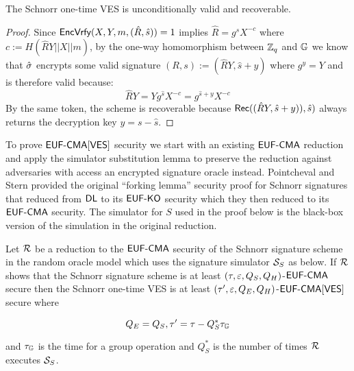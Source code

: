 \begin{lemma}
The Schnorr one-time VES is unconditionally valid and recoverable.
\end{lemma}

\begin{proof}
 Since $\textsf{EncVrfy}(X,Y,m,(\hat{R},\hat{s})) = 1$ implies $ \hat{R} = g^{\hat{s}}X^{-c}$ where $c := H(\hat{R}Y || X || m)$, by the one-way homomorphism between $\mathbb{Z}_q$ and $\mathbb{G}$ we know that $\hat{\sigma}$ encrypts some valid signature $(R,s) := (\hat{R}Y, \hat{s} + y)$ where $g^y = Y$ and is therefore valid because:
\[ \hat{R}Y = Yg^{\hat{s}}X^{-c} = g^{\hat{s} + y}X^{-c} \]
By the same token, the scheme is recoverable because $\textsf{Rec}((\hat{R}Y, \hat{s} + y)), \hat{s})$ always returns the decryption key $y = s - \hat{s}$.
\end{proof}

To prove $\textsf{EUF-CMA}[\textsf{VES}]$ security we start with an existing $\textsf{EUF-CMA}$ reduction and apply the simulator substitution lemma to preserve the reduction against adversaries with access an encrypted signature oracle instead.
Pointcheval and Stern\cite{pointcheval2000security} provided the original ``forking lemma'' \EUFCMA security proof for Schnorr signatures that reduced from $\textsf{DL}$ to its $\textsf{EUF-KO}$ security which they then reduced to its $\textsf{EUF-CMA}$ security.
The simulator for $S$ used in the proof below is the black-box version of the simulation in the original reduction.

\begin{theorem}

  Let $\mathcal{R}$ be a reduction to the $\textsf{EUF-CMA}$ security of the Schnorr signature scheme in the random oracle model which uses the signature simulator $\mathcal{S}_S$ as below.
  If $\mathcal{R}$ shows that the Schnorr signature scheme is at least $(\tau,\varepsilon,Q_S,Q_H)$-$\textsf{EUF-CMA}$ secure then the Schnorr one-time VES is at least $(\tau',\varepsilon,Q_E,Q_H)$-$\textsf{EUF-CMA}[\textsf{VES}]$ secure where

  \[ Q_E = Q_S, \tau' = \tau -  Q_S^*\tau_{\mathbb{G}} \]

  \hfill \break and $\tau_{\mathbb{G}}$ is the time for a group operation and $Q_S^*$ is the number of times $\mathcal{R}$ executes $\mathcal{S}_S$.
\end{theorem}


